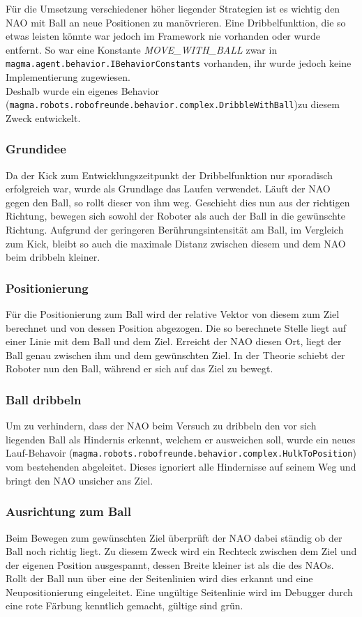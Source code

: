 Für die Umsetzung verschiedener höher liegender Strategien ist es wichtig den NAO mit Ball an neue Positionen zu manövrieren. Eine Dribbelfunktion, die so etwas leisten könnte war jedoch im Framework nie vorhanden oder wurde entfernt. So war eine Konstante \textit{MOVE\_WITH\_BALL} zwar in \texttt{magma.agent.behavior.IBehaviorConstants} vorhanden, ihr wurde jedoch keine Implementierung zugewiesen.\\
Deshalb wurde ein eigenes Behavior (\texttt{magma.robots.robofreunde.behavior.complex.DribbleWithBall})zu diesem Zweck entwickelt.

\subsubsection{Grundidee}
Da der Kick zum Entwicklungszeitpunkt der Dribbelfunktion nur sporadisch erfolgreich war, wurde als Grundlage das Laufen verwendet. Läuft der NAO gegen den Ball, so rollt dieser von ihm weg. Geschieht dies nun aus der richtigen Richtung, bewegen sich sowohl der Roboter als auch der Ball in die gewünschte Richtung. Aufgrund der geringeren Berührungsintensität am Ball, im Vergleich zum Kick, bleibt so auch die maximale Distanz zwischen diesem und dem NAO beim dribbeln kleiner.

\subsubsection{Positionierung}
Für die Positionierung zum Ball wird der relative Vektor von diesem zum Ziel berechnet und von dessen Position abgezogen. Die so berechnete Stelle liegt auf einer Linie mit dem Ball und dem Ziel. Erreicht der NAO diesen Ort, liegt der Ball genau zwischen ihm und dem gewünschten Ziel. In der Theorie schiebt der Roboter nun den Ball, während er sich auf das Ziel zu bewegt.

\subsubsection{Ball dribbeln}
Um zu verhindern, dass der NAO beim Versuch zu dribbeln den vor sich liegenden Ball als Hindernis erkennt, welchem er ausweichen soll, wurde ein neues Lauf-Behavoir (\texttt{magma.robots.robofreunde.behavior.complex.HulkToPosition}) vom bestehenden abgeleitet. Dieses ignoriert alle Hindernisse auf seinem Weg und bringt den NAO unsicher ans Ziel.

\subsubsection{Ausrichtung zum Ball}
Beim Bewegen zum gewünschten Ziel überprüft der NAO dabei ständig ob der Ball noch richtig liegt. Zu diesem Zweck wird ein Rechteck zwischen dem Ziel und der eigenen Position ausgespannt, dessen Breite kleiner ist als die des NAOs. Rollt der Ball nun über eine der Seitenlinien wird dies erkannt und eine Neupositionierung eingeleitet. Eine ungültige Seitenlinie wird im Debugger durch eine rote Färbung kenntlich gemacht, gültige sind grün.


